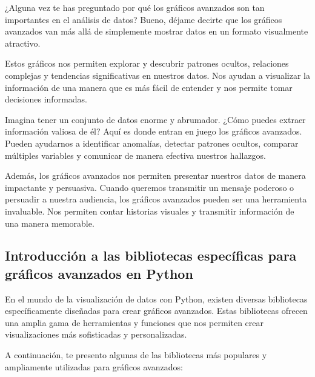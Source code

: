 \documentclass[
  a4paper,
]{article}
\begin{document}
¿Alguna vez te has preguntado por qué los gráficos avanzados son tan
importantes en el análisis de datos? Bueno, déjame decirte que los
gráficos avanzados van más allá de simplemente mostrar datos en un
formato visualmente atractivo.

Estos gráficos nos permiten explorar y descubrir patrones ocultos,
relaciones complejas y tendencias significativas en nuestros datos. Nos
ayudan a visualizar la información de una manera que es más fácil de
entender y nos permite tomar decisiones informadas.

Imagina tener un conjunto de datos enorme y abrumador. ¿Cómo puedes
extraer información valiosa de él? Aquí es donde entran en juego los
gráficos avanzados. Pueden ayudarnos a identificar anomalías, detectar
patrones ocultos, comparar múltiples variables y comunicar de manera
efectiva nuestros hallazgos.

Además, los gráficos avanzados nos permiten presentar nuestros datos de
manera impactante y persuasiva. Cuando queremos transmitir un mensaje
poderoso o persuadir a nuestra audiencia, los gráficos avanzados pueden
ser una herramienta invaluable. Nos permiten contar historias visuales y
transmitir información de una manera memorable.

\hypertarget{introducciuxf3n-a-las-bibliotecas-especuxedficas-para-gruxe1ficos-avanzados-en-python}{%
\subsection{Introducción a las bibliotecas específicas para gráficos
avanzados en
Python}\label{introducciuxf3n-a-las-bibliotecas-especuxedficas-para-gruxe1ficos-avanzados-en-python}}

En el mundo de la visualización de datos con Python, existen diversas
bibliotecas específicamente diseñadas para crear gráficos avanzados.
Estas bibliotecas ofrecen una amplia gama de herramientas y funciones
que nos permiten crear visualizaciones más sofisticadas y
personalizadas.

A continuación, te presento algunas de las bibliotecas más populares y
ampliamente utilizadas para gráficos avanzados:
\end{document}
